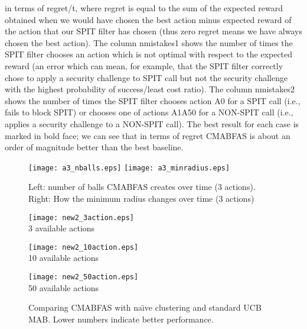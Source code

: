 \documentclass{llncs}
\begin{document}
\begin{sidewaystable}
{in terms of regret/t, where regret is equal to the sum of the expected reward obtained when we would have chosen the best action minus expected
reward of the action that our SPIT filter has chosen (thus zero regret means we have always chosen the best action). The column nmistakes1 shows
the number of times the SPIT filter chooses an action which is not optimal with respect to the expected reward (an error which can mean, for example, that the SPIT filter correctly chose to apply a security challenge to SPIT call but not the security challenge with the highest probability of success/least cost ratio). The column nmistakes2 shows the number of times the SPIT filter 
chooses action A0 for a SPIT call (i.e., fails to block SPIT) or chooses one of actions A1A50 for a NON-SPIT call (i.e., applies
a security challenge to a NON-SPIT call). The best result for each case is marked in bold face; we can see that in terms of regret CMABFAS is about an
order of magnitude better than the best baseline.}
\label{tab:results}
\end{sidewaystable}


\begin{figure}[!t]
\centerline{
\texttt{[image: a3\_nballs.eps]}
\texttt{[image: a3\_minradius.eps]}
}
\caption{Left: number of balls CMABFAS creates over time (3 actions). 
Right: How the minimum radius changes over time (3 actions) }
\label{fig:nballs}
\end{figure}



\begin{figure}[!t]
\begin{center}
\begin{minipage}{0.32\textwidth}
\begin{center}
		\texttt{[image: new2\_3action.eps]}\\
	
	{\small 3 available actions}
	\end{center}
\end{minipage}
\begin{minipage}{0.32\textwidth}
\begin{center}
		\texttt{[image: new2\_10action.eps]}\\
		
		{\small 10 available actions}
\end{center}
\end{minipage}
\begin{minipage}{0.32\textwidth}
\begin{center}
		\texttt{[image: new2\_50action.eps]}\\
		
		{\small 50 available actions}
\end{center}		
\end{minipage}

\end{center}
\caption{
 Comparing CMABFAS with na\"{\i}ve clustering and standard UCB MAB. Lower numbers indicate better performance.}
\label{fig:results}
\end{figure}
\end{document}
